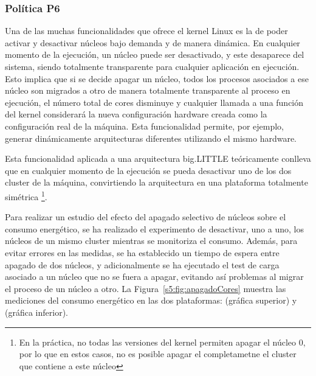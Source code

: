 \subsubsection{Política P6}
\label{sec:p6}

Una de las muchas funcionalidades que ofrece el kernel Linux es la de poder
activar y desactivar núcleos bajo demanda y de manera dinámica. En cualquier
momento de la ejecución, un núcleo puede ser desactivado, y este desaparece
del sistema, siendo totalmente transparente para cualquier aplicación en
ejecución. Esto implica que si se decide apagar un núcleo, todos los procesos
asociados a ese núcleo son migrados a otro de manera totalmente
transparente al proceso en ejecución, el número total de cores disminuye y
cualquier llamada a una función del kernel considerará la nueva
configuración hardware creada como la configuración real de la
máquina. Esta funcionalidad permite, por ejemplo, generar dinámicamente
arquitecturas diferentes utilizando el mismo hardware.

Esta funcionalidad aplicada a una arquitectura big.LITTLE teóricamente
conlleva que en cualquier momento de la ejecución se pueda desactivar
uno de los dos cluster de la máquina, convirtiendo la arquitectura en una
plataforma totalmente simétrica \footnote{En la práctica, no todas las versiones
del kernel permiten apagar el núcleo 0, por lo que en estos casos, no es posible apagar el
completametne el cluster que contiene a este núcleo}.

Para realizar un estudio del efecto del apagado selectivo de núcleos sobre el
consumo energético, se ha realizado el experimento de desactivar, uno a uno,
los núcleos de un mismo cluster mientras se monitoriza el consumo. Además, para
evitar errores en las medidas, se ha establecido un tiempo de espera entre
apagado de dos núcleos, y adicionalmente se ha ejecutado el test de carga asociado a
un núcleo que no se fuera a apagar, evitando así problemas al migrar el
proceso de un núcleo a otro. La Figura~\ref{s5:fig:apagadoCores} muestra las
mediciones del consumo energético en las dos plataformas: 
\juno (gráfica superior) y \odroid (gráfica inferior).

